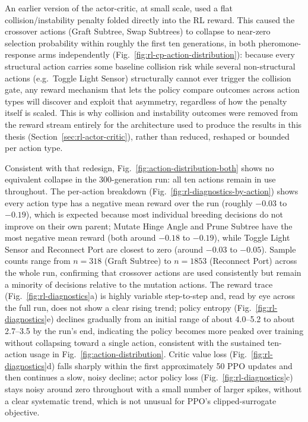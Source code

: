 \documentclass[12pt,a4paper]{report}
\begin{document}
An earlier version of the actor-critic, at small scale, used a flat collision/instability penalty folded directly into the RL reward. This caused the crossover actions (Graft Subtree, Swap Subtrees) to collapse to near-zero selection probability within roughly the first ten generations, in both pheromone-response arms independently (Fig.~\ref{fig:rl-cp-action-distribution}): because every structural action carries some baseline collision risk while several non-structural actions (e.g.\ Toggle Light Sensor) structurally cannot ever trigger the collision gate, any reward mechanism that lets the policy compare outcomes across action types will discover and exploit that asymmetry, regardless of how the penalty itself is scaled. This is why collision and instability outcomes were removed from the reward stream entirely for the architecture used to produce the results in this thesis (Section~\ref{sec:rl-actor-critic}), rather than reduced, reshaped or bounded per action type.

Consistent with that redesign, Fig.~\ref{fig:action-distribution-both} shows no equivalent collapse in the 300-generation run: all ten actions remain in use throughout. The per-action breakdown (Fig.~\ref{fig:rl-diagnostics-by-action}) shows every action type has a negative mean reward over the run (roughly $-0.03$ to $-0.19$), which is expected because most individual breeding decisions do not improve on their own parent; Mutate Hinge Angle and Prune Subtree have the most negative mean reward (both around $-0.18$ to $-0.19$), while Toggle Light Sensor and Reconnect Port are closest to zero (around $-0.03$ to $-0.05$). Sample counts range from $n=318$ (Graft Subtree) to $n=1853$ (Reconnect Port) across the whole run, confirming that crossover actions are used consistently but remain a minority of decisions relative to the mutation actions. The reward trace (Fig.~\ref{fig:rl-diagnostics}a) is highly variable step-to-step and, read by eye across the full run, does not show a clear rising trend; policy entropy (Fig.~\ref{fig:rl-diagnostics}e) declines gradually from an initial range of about 4.0--5.2 to about 2.7--3.5 by the run's end, indicating the policy becomes more peaked over training without collapsing toward a single action, consistent with the sustained ten-action usage in Fig.~\ref{fig:action-distribution}. Critic value loss (Fig.~\ref{fig:rl-diagnostics}d) falls sharply within the first approximately 50 PPO updates and then continues a slow, noisy decline; actor policy loss (Fig.~\ref{fig:rl-diagnostics}c) stays noisy around zero throughout with a small number of larger spikes, without a clear systematic trend, which is not unusual for PPO's clipped-surrogate objective.
\end{document}
